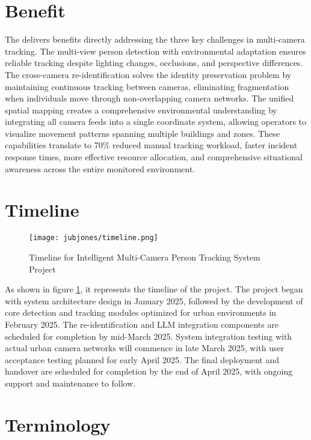 \newpage

\section{Benefit}
\label{section:benefit}
The \usevar{\srsTitle} delivers benefits directly addressing the three key challenges in multi-camera tracking. The multi-view person detection with environmental adaptation ensures reliable tracking despite lighting changes, occlusions, and perspective differences.
The cross-camera re-identification solves the identity preservation problem by maintaining continuous tracking between cameras, eliminating fragmentation when individuals move through non-overlapping camera networks.
The unified spatial mapping creates a comprehensive environmental understanding by integrating all camera feeds into a single coordinate system, allowing operators to visualize movement patterns spanning multiple buildings and zones.
These capabilities translate to 70\% reduced manual tracking workload, faster incident response times, more effective resource allocation, and comprehensive situational awareness across the entire monitored environment.

\section{Timeline}
\label{section:timeline}

\begin{figure}[!htb]
    \centering
    \texttt{[image: jubjones/timeline.png]}
    \caption{Timeline for Intelligent Multi-Camera Person Tracking System Project}
    \label{fig:timeline}
\end{figure}

As shown in figure \ref{fig:timeline}, it represents the timeline of the project.
The project began with system architecture design in January 2025, followed by the development of core detection
and tracking modules optimized for urban environments in February 2025. The re-identification and LLM integration components are scheduled for
completion by mid-March 2025.
System integration testing with actual urban camera networks will commence in late March 2025, with user acceptance testing planned for early April 2025.
The final deployment and handover are scheduled for completion by the end of April 2025, with ongoing support
and maintenance to follow.

\section{Terminology}
\label{section:terminology}

